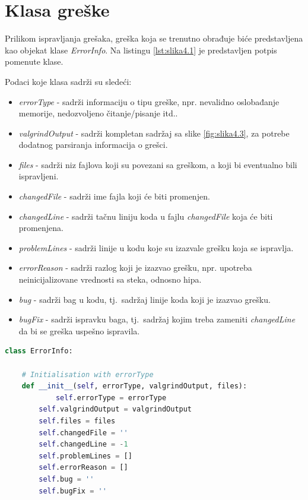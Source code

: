 \documentclass[12pt,oneside]{memoir}
\theoremstyle{plain}
\theoremstyle{definition}
\begin{document}
\section{Klasa greške}
Prilikom ispravljanja grešaka, greška koja se trenutno obrađuje biće predstavljena kao objekat klase \textit{ErrorInfo}. Na listingu \ref{lst:slika4.1} je predstavljen potpis pomenute klase.

Podaci koje klasa sadrži su sledeći:
\begin{itemize}
\item \textit{errorType} - sadrži informaciju o tipu greške, npr. nevalidno oslobađanje memorije, nedozvoljeno čitanje/pisanje itd..
\item \textit{valgrindOutput} - sadrži kompletan sadržaj sa slike \ref{fig:slika4.3}, za potrebe dodatnog parsiranja informacija o grešci.
\item \textit{files} - sadrži niz fajlova koji su povezani sa greškom, a koji bi eventualno bili ispravljeni.
\item \textit{changedFile} - sadrži ime fajla koji će biti promenjen.
\item \textit{changedLine} - sadrži tačnu liniju koda u fajlu \textit{changedFile} koja će biti promenjena.
\item \textit{problemLines} - sadrži linije u kodu koje su izazvale grešku koja se ispravlja.
\item \textit{errorReason} - sadrži razlog koji je izazvao grešku, npr. upotreba neinicijalizovane vrednosti sa steka, odnosno hipa.
\item \textit{bug} - sadrži bag u kodu, tj.~sadržaj linije koda koji je izazvao grešku.
\item \textit{bugFix} - sadrži ispravku baga, tj.~sadržaj kojim treba zameniti \textit{changedLine} da bi se greška uspešno ispravila.
\end{itemize}

\begin{lstlisting}[style=mystyle,caption={Potpis klase \textit{ErrorInfo}}, label={lst:slika4.1},language={Python}] 
class ErrorInfo:

	# Initialisation with errorType
	def __init__(self, errorType, valgrindOutput, files):
        	self.errorType = errorType
		self.valgrindOutput = valgrindOutput
		self.files = files
		self.changedFile = ''
		self.changedLine = -1
		self.problemLines = []
		self.errorReason = []
		self.bug = ''
		self.bugFix = ''
\end{lstlisting}
\end{document}
